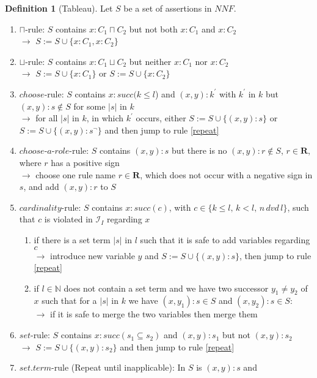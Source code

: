 \documentclass[a4paper,11pt]{scrartcl}
\theoremstyle{break}
\theoremstyle{definition}
\newtheorem{mydef}{Definition}
\begin{document}
\begin{mydef}[Tableau]
Let $S$ be a set of assertions in $NNF$.
\begin{enumerate}
\item\label{cap} $\sqcap$-rule: $S$ contains $x:C_1\sqcap C_2$ but not both $x:C_1$ and $x:C_2$\\
$\rightarrow$ $S:=S\cup\{x:C_1, x:C_2\}$
\item\label{cup} $\sqcup$-rule: $S$ contains $x:C_1\sqcup C_2$ but neither $x:C_1$ nor $x:C_2$\\
$\rightarrow$ $S:=S\cup\{x:C_1\}$ or $S:=S\cup\{x:C_2\}$
\item\label{choose}$choose$-rule: $S$ contains
$x:succ(k\leq l$) and $(x,y):k^\prime$ with $k^\prime$ in $k$ but $(x,y):s\not\in S$ for some $|s|$ in $k$\\
$\rightarrow$ for all $|s|$ in $k$, in which $k^\prime$ occurs, either $S:=S\cup\{(x,y):s\}$ or $S:=S\cup\{(x,y):s^\neg\}$ and then jump to rule \ref{repeat} 
\item\label{chooserole}$choose$-$a$-$role$-rule: $S$ contains $(x,y):s$ but there is no $(x,y):r\notin S$, $r\in\mathbf{R}$, where $r$ has a positive sign\\
$\rightarrow$ choose one rule name $r\in\mathbf{R}$, which does not occur with a negative sign in $s$, and add $(x,y):r$ to $S$
\item\label{c}$cardinality$-rule: $S$ contains $x:succ(c)$, with $c\in\{k\leq l,\,k<l,\, n\, dvd\,l\}$, such that $c$ is violated in $\mathcal{I}_I$ regarding $x$
\begin{enumerate}
\item \label{setterm} if there is a set term $|s|$ in $l$ such that it is safe to add variables regarding $c$\\
$\rightarrow$ introduce new variable $y$ and $S:=S\cup\{(x,y):s\}$, then jump to rule \ref{repeat}
\item \label{exceeded} if $l\in \mathbb{N}$ does not contain a set term and we have two successor $y_1\neq y_2$ of $x$ such that for a $|s|$ in $k$ we have $(x,y_1):s\in S$ and $(x,y_2):s\in S$:\\
$\rightarrow$ if it is safe to merge the two variables then merge them
\end{enumerate}
\item\label{s}$set$-rule: $S$ contains $x:succ(s_1\subseteq s_2)$ and $(x,y):s_1$ but not $(x,y):s_2$\\
$\rightarrow$ $S:=S\cup\{(x,y):s_2\}$ and then jump to rule \ref{repeat}
\item\label{repeat} $set.term$-rule (Repeat until inapplicable): In $S$ is $(x,y):s$ and

\end{enumerate}
\end{mydef}
\end{document}

